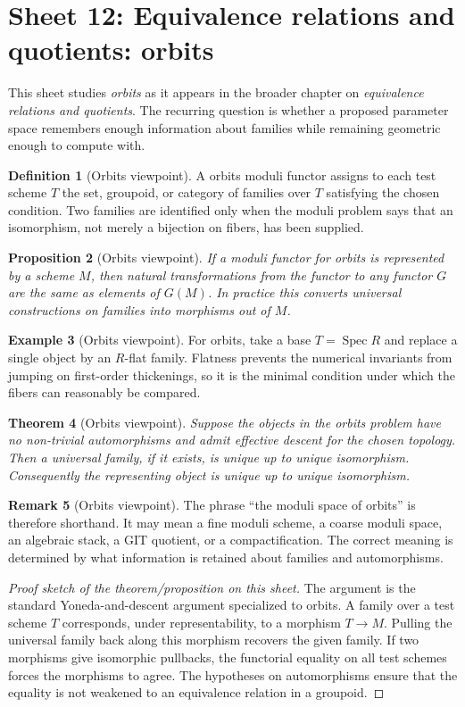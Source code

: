 \documentclass[11pt]{amsart}
\newtheorem{theorem}{Theorem}[section]
\newtheorem{proposition}[theorem]{Proposition}
\theoremstyle{definition}
\newtheorem{definition}[theorem]{Definition}
\newtheorem{example}[theorem]{Example}
\newtheorem{remark}[theorem]{Remark}
\newcommand{\Spec}{\operatorname{Spec}}
\begin{document}
\section{Sheet 12: Equivalence relations and quotients: orbits}
This sheet studies \emph{orbits} as it appears in the broader chapter on \emph{equivalence relations and quotients}.  The recurring question is whether a proposed parameter space remembers enough information about families while remaining geometric enough to compute with.
\begin{definition}[Orbits viewpoint]
A orbits moduli functor assigns to each test scheme $T$ the set, groupoid, or category of families over $T$ satisfying the chosen condition.  Two families are identified only when the moduli problem says that an isomorphism, not merely a bijection on fibers, has been supplied.
\end{definition}
\begin{proposition}[Orbits viewpoint]
If a moduli functor for orbits is represented by a scheme $M$, then natural transformations from the functor to any functor $G$ are the same as elements of $G(M)$.  In practice this converts universal constructions on families into morphisms out of $M$.
\end{proposition}
\begin{example}[Orbits viewpoint]
For orbits, take a base $T=\Spec R$ and replace a single object by an $R$-flat family.  Flatness prevents the numerical invariants from jumping on first-order thickenings, so it is the minimal condition under which the fibers can reasonably be compared.
\end{example}
\begin{theorem}[Orbits viewpoint]
Suppose the objects in the orbits problem have no non-trivial automorphisms and admit effective descent for the chosen topology.  Then a universal family, if it exists, is unique up to unique isomorphism.  Consequently the representing object is unique up to unique isomorphism.
\end{theorem}
\begin{remark}[Orbits viewpoint]
The phrase ``the moduli space of orbits'' is therefore shorthand.  It may mean a fine moduli scheme, a coarse moduli space, an algebraic stack, a GIT quotient, or a compactification.  The correct meaning is determined by what information is retained about families and automorphisms.
\end{remark}
\begin{proof}[Proof sketch of the theorem/proposition on this sheet]
The argument is the standard Yoneda-and-descent argument specialized to orbits.  A family over a test scheme $T$ corresponds, under representability, to a morphism $T\to M$.  Pulling the universal family back along this morphism recovers the given family.  If two morphisms give isomorphic pullbacks, the functorial equality on all test schemes forces the morphisms to agree.  The hypotheses on automorphisms ensure that the equality is not weakened to an equivalence relation in a groupoid.
\end{proof}
\end{document}
